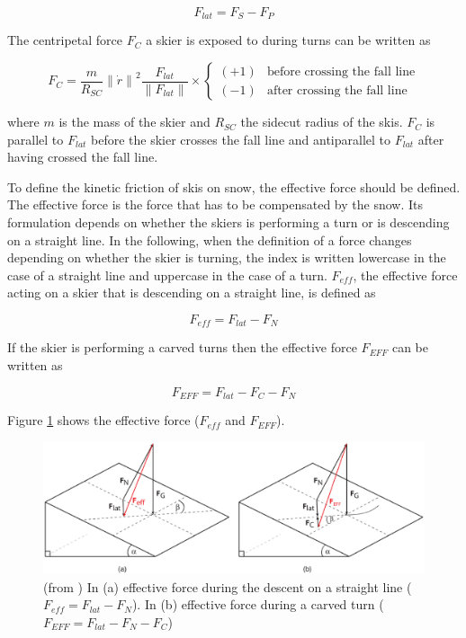 \documentclass[12pt,a4paper,twoside]{book}
\newcommand{\norm}[1]{\lVert#1\rVert}
\begin{document}
\begin{equation}
F_{lat}=F_S-F_P
\end{equation}

The centripetal force $F_C$ a skier is exposed to during turns can be written as

\begin{equation}
F_C=\frac{m}{R_{SC}} {\norm{\dot{r}}}^2 \frac{F_{lat}}{\norm{F_{lat}}} \times
\begin{cases}
  (+1) & \text{before crossing the fall line} \\
  (-1) & \text{after crossing the fall line}
  \end{cases}
\end{equation}

where $m$ is the mass of the skier and $R_{SC}$ the sidecut radius of the skis. $F_C$ is parallel to $F_{lat}$ before the skier crosses the fall line and antiparallel to $F_{lat}$ after having crossed the fall line.

To define the kinetic friction of skis on snow, the effective force should be defined. The effective force is the force that has to be compensated by the snow. Its formulation depends on whether the skiers is performing a turn or is descending on a straight line. In the following, when the definition of a force changes depending on whether the skier is turning, the index is written lowercase in the case of a straight line and uppercase in the case of a turn. $F_{eff}$, the effective force acting on a skier that is descending on a straight line, is defined as

\begin{equation}
F_{eff}=F_{lat}-F_N
\end{equation}

If the skier is performing a carved turns then the effective force $F_{EFF}$ can be written as

\begin{equation}
F_{EFF}=F_{lat}-F_C-F_N
\end{equation}

Figure \ref{effective_force_pic} shows the effective force ($F_{eff}$ and $F_{EFF}$).

\begin{figure}[!ht]
  \begin{center}
    \includegraphics[width=\textwidth]{images/figure6.eps}
    \caption{(from \cite{hol2012}) In (a) effective force during the descent on a straight line ($F_{eff}=F_{lat}-F_N$). In (b) effective force during a carved turn ($F_{EFF}=F_{lat}-F_N-F_C$)}\label{effective_force_pic}
  \end{center}
\end{figure}
\end{document}
